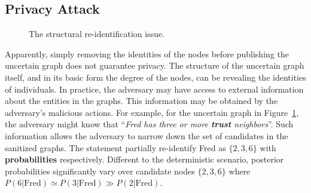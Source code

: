\subsection{Privacy Attack}
\label{sec:AMPC}
\begin{figure}[!htb]
    \caption{The structural re-identification issue.}
    \label{fig:privacyAttack}
\end{figure} 
Apparently, simply removing the identities of the nodes before publishing the uncertain graph does not guarantee privacy.  The structure of the uncertain graph itself, and in its basic form the degree of the nodes, can be revealing the identities of individuals. 
In practice, the adversary may have access to external information about the entities in the graphs. This information may be obtained by the adversary's malicious actions. 
For example, for the uncertain graph in Figure~\ref{fig:privacyAttack}, the adversary might know that ``\emph{Fred has three or more \textbf{trust} neighbors}''. Such information allows the adversary to narrow down the set of candidates in the sanitized graphs.  The statement partially re-identify Fred as $\lbrace 2,3,6 \rbrace$ with \textbf{probabilities} respectively. 
Different to the deterministic scenario, posterior probabilities significantly vary over candidate nodes $\lbrace 2,3,6 \rbrace$ where $P(6|\text{Fred}) \simeq P(3|\text{Fred}) \gg P(2|\text{Fred})$.

